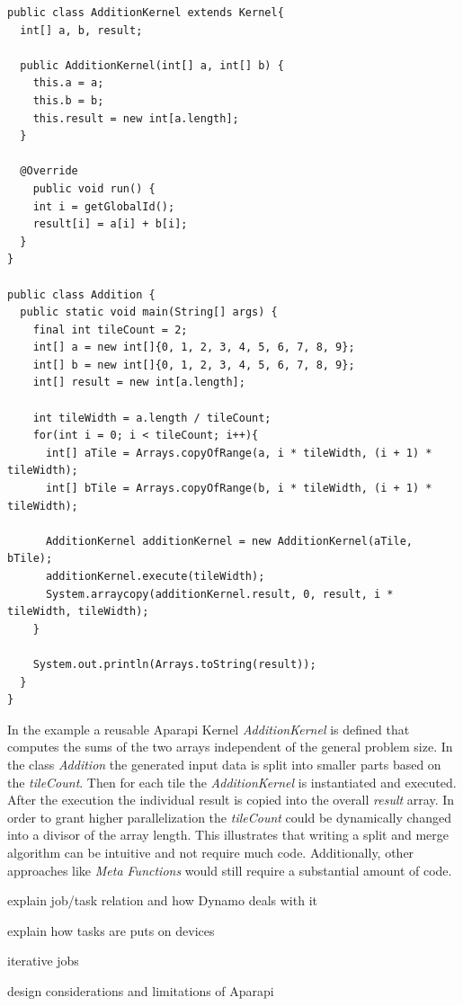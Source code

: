 \begin{lstlisting}
public class AdditionKernel extends Kernel{
  int[] a, b, result;

  public AdditionKernel(int[] a, int[] b) {
    this.a = a;
    this.b = b;
    this.result = new int[a.length];
  }

  @Override
    public void run() {
    int i = getGlobalId();
    result[i] = a[i] + b[i];
  }
}

public class Addition {
  public static void main(String[] args) {
    final int tileCount = 2;
    int[] a = new int[]{0, 1, 2, 3, 4, 5, 6, 7, 8, 9};
    int[] b = new int[]{0, 1, 2, 3, 4, 5, 6, 7, 8, 9};
    int[] result = new int[a.length];

    int tileWidth = a.length / tileCount;
    for(int i = 0; i < tileCount; i++){
      int[] aTile = Arrays.copyOfRange(a, i * tileWidth, (i + 1) * tileWidth);
      int[] bTile = Arrays.copyOfRange(b, i * tileWidth, (i + 1) * tileWidth);

      AdditionKernel additionKernel = new AdditionKernel(aTile, bTile);
      additionKernel.execute(tileWidth);
      System.arraycopy(additionKernel.result, 0, result, i * tileWidth, tileWidth);
    }

    System.out.println(Arrays.toString(result));
  }
}

\end{lstlisting}

In the example a reusable Aparapi Kernel \textit{AdditionKernel} is defined that computes the sums of the two arrays independent of the general problem size. In the class \textit{Addition} the generated input data is split into smaller parts based on the \textit{tileCount}. Then for each tile the \textit{AdditionKernel} is instantiated and executed. After the execution the individual result is copied into the overall \textit{result} array. In order to grant higher parallelization the \textit{tileCount} could be dynamically changed into a divisor of the array length. This illustrates that writing a split and merge algorithm can be intuitive and not require much code. Additionally, other approaches like \textit{Meta Functions} would still require a substantial amount of code.

explain job/task relation and how Dynamo deals with it

explain how tasks are puts on devices

iterative jobs

design considerations and limitations of Aparapi

